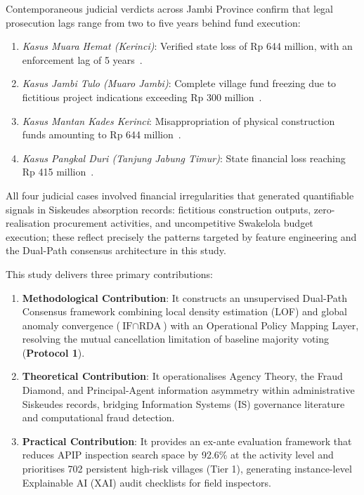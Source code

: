 \documentclass[runningheads]{llncs}
\begin{document}
Contemporaneous judicial verdicts across Jambi Province confirm that legal prosecution lags range from two to five years behind fund execution:
\begin{enumerate}
    \item \textit{Kasus Muara Hemat (Kerinci)}: Verified state loss of Rp 644 million, with an enforcement lag of 5 years~\cite{ref28,ref30}.
    \item \textit{Kasus Jambi Tulo (Muaro Jambi)}: Complete village fund freezing due to fictitious project indications exceeding Rp 300 million~\cite{ref29}.
    \item \textit{Kasus Mantan Kades Kerinci}: Misappropriation of physical construction funds amounting to Rp 644 million~\cite{ref30}.
    \item \textit{Kasus Pangkal Duri (Tanjung Jabung Timur)}: State financial loss reaching Rp 415 million~\cite{ref31}.
\end{enumerate}
All four judicial cases involved financial irregularities that generated quantifiable signals in Siskeudes absorption records: fictitious construction outputs, zero-realisation procurement activities, and uncompetitive Swakelola budget execution; these reflect precisely the patterns targeted by feature engineering and the Dual-Path consensus architecture in this study.

This study delivers three primary contributions:
\begin{enumerate}
    \item \textbf{Methodological Contribution}: It constructs an unsupervised Dual-Path Consensus framework combining local density estimation (LOF) and global anomaly convergence ($\text{IF} \cap \text{RDA}$) with an Operational Policy Mapping Layer, resolving the mutual cancellation limitation of baseline majority voting (\textbf{Protocol 1}).
    \item \textbf{Theoretical Contribution}: It operationalises Agency Theory, the Fraud Diamond, and Principal-Agent information asymmetry within administrative Siskeudes records, bridging Information Systems (IS) governance literature and computational fraud detection.
    \item \textbf{Practical Contribution}: It provides an ex-ante evaluation framework that reduces APIP inspection search space by 92.6\% at the activity level and prioritises 702 persistent high-risk villages (Tier 1), generating instance-level Explainable AI (XAI) audit checklists for field inspectors.
\end{enumerate}
\end{document}

